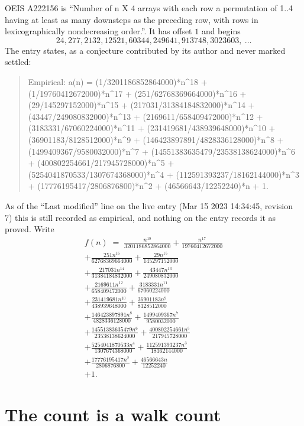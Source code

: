 \documentclass[11pt,a4paper]{article}
\theoremstyle{plain}
\theoremstyle{definition}
\begin{document}
OEIS A222156 is ``Number of n X 4 arrays with each row a permutation of 1..4 having at least as many downsteps as the preceding row, with rows in lexicographically nondecreasing order.''. It has offset $1$ and begins
\[
24, 277, 2132, 12521, 60344, 249641, 913748, 3023603,\ \dots
\]
The entry states, as a conjecture contributed by its author and never marked settled:
\begin{quote}\raggedright\small
Empirical: a(n) = (1/3201186852864000)*n\^{}18 + (1/19760412672000)*n\^{}17 + (251/62768369664000)*n\^{}16 + (29/145297152000)*n\^{}15 + (217031/31384184832000)*n\^{}14 + (43447/249080832000)*n\^{}13 + (2169611/658409472000)*n\^{}12 + (3183331/67060224000)*n\^{}11 + (231419681/438939648000)*n\^{}10 + (36901183/8128512000)*n\^{}9 + (146423897891/4828336128000)*n\^{}8 + (1499409367/9580032000)*n\^{}7 + (14551383635479/23538138624000)*n\^{}6 + (400802254661/217945728000)*n\^{}5 + (5254041870533/1307674368000)*n\^{}4 + (112591393237/18162144000)*n\^{}3 + (17776195417/2806876800)*n\^{}2 + (46566643/12252240)*n + 1.
\end{quote}
As of the ``Last modified'' line on the live entry (Mar 15 2023 14:34:45, revision 7) this is still
recorded as empirical, and nothing on the entry records it as proved. Write
\begin{multline*}
f(n)\;=\;\frac{n^{18}}{3201186852864000} + \frac{n^{17}}{19760412672000} \\
+ \frac{251 n^{16}}{62768369664000} + \frac{29 n^{15}}{145297152000} \\
+ \frac{217031 n^{14}}{31384184832000} + \frac{43447 n^{13}}{249080832000} \\
+ \frac{2169611 n^{12}}{658409472000} + \frac{3183331 n^{11}}{67060224000} \\
+ \frac{231419681 n^{10}}{438939648000} + \frac{36901183 n^{9}}{8128512000} \\
+ \frac{146423897891 n^{8}}{4828336128000} + \frac{1499409367 n^{7}}{9580032000} \\
+ \frac{14551383635479 n^{6}}{23538138624000} + \frac{400802254661 n^{5}}{217945728000} \\
+ \frac{5254041870533 n^{4}}{1307674368000} + \frac{112591393237 n^{3}}{18162144000} \\
+ \frac{17776195417 n^{2}}{2806876800} + \frac{46566643 n}{12252240} \\
+ 1.
\end{multline*}

\section{The count is a walk count}
\end{document}
